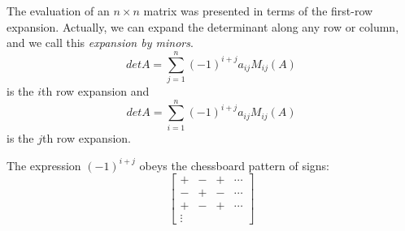 \documentclass[../main.tex]{subfiles}
\begin{document}
The evaluation of an \(n \times n\) matrix was presented in terms of the first-row expansion. Actually, we can expand the determinant along any row or column, and we call this \emph{expansion by minors}.
\begin{equation*}
  det A = \sum^n_{j=1}(-1)^{i+j}a_{ij}M_{ij}(A)
\end{equation*}
is the \(i\)th row expansion and 
\begin{equation*}
  det A = \sum^n_{i=1}(-1)^{i+j}a_{ij}M_{ij}(A)
\end{equation*}
is the \(j\)th row expansion.
\begin{remark}
  The expression \((-1)^{i+j}\) obeys the chessboard pattern of signs:
  \begin{equation*}
    \begin{bmatrix}
      + & - & + & \cdots\\
      - & + & - & \cdots\\
      + & - & + & \cdots\\
      \vdots
    \end{bmatrix}
  \end{equation*}
\end{remark}
\end{document}

